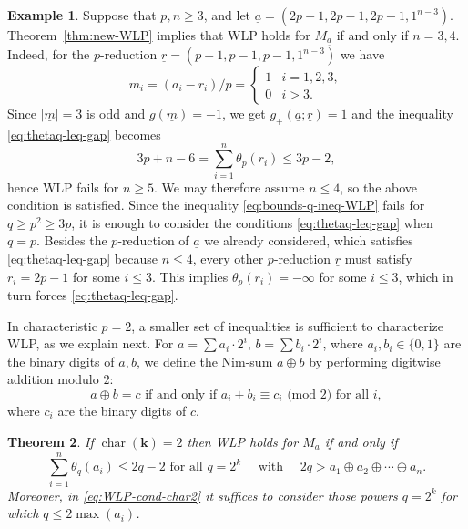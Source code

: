 \documentclass[11pt,reqno]{amsart}
\newcommand{\defi}[1]{{\upshape\sffamily #1}}
\def\kk{{\mathbf k}}
\newcommand{\op}[1]{\operatorname{#1}}
\newcommand{\ul}[1]{\underline{#1}}
\newtheorem{theorem}{Theorem}[section]
\theoremstyle{definition}
\newtheorem{example}[theorem]{Example}
\theoremstyle{remark}
\numberwithin{equation}{section}
\begin{document}
\begin{example}\label{ex:2p-1s}
    Suppose that $p,n\geq 3$, and let $\ul{a}=(2p-1,2p-1,2p-1,1^{n-3})$. Theorem~\ref{thm:new-WLP} implies that WLP holds for $M_{\ul{a}}$ if and only if $n=3,4$. Indeed, for the $p$-reduction $\ul{r}=(p-1,p-1,p-1,1^{n-3})$ we have 
    \[m_i = (a_i-r_i)/p=\begin{cases}
        1 & i=1,2,3,\\
        0 & i>3.
    \end{cases}\]
    Since $|\ul{m}|=3$ is odd and $g(\ul{m}) = -1$, we get $g_+(\ul{a};\ul{r})=1$ and the inequality \eqref{eq:thetaq-leq-gap} becomes
    \[3p+n-6 = \sum_{i=1}^n\theta_p(r_i)\leq 3p-2,\]
    hence WLP fails for $n\geq 5$. We may therefore assume $n\leq 4$, so the above condition is satisfied. Since the inequality \eqref{eq:bounds-q-ineq-WLP} fails for $q\geq p^2\geq 3p$, it is enough to consider the conditions \eqref{eq:thetaq-leq-gap} when $q=p$. Besides the $p$-reduction of $\ul{a}$ we already considered, which satisfies \eqref{eq:thetaq-leq-gap} because $n\leq 4$, every other $p$-reduction $\ul{r}$ must satisfy $r_i = 2p-1$ for some $i\leq 3$. This implies $\theta_p(r_i)=-\infty$ for some $i\leq 3$, which in turn forces \eqref{eq:thetaq-leq-gap}.
\end{example}

In characteristic $p=2$, a smaller set of inequalities is sufficient to characterize WLP, as we explain next. For $a=\sum a_i\cdot 2^i$, $b=\sum b_i\cdot 2^i$, where $a_i,b_i\in\{0,1\}$ are the binary digits of $a,b$, we define the \defi{Nim-sum} $a\oplus b$ by performing digitwise addition modulo $2$:
\begin{equation}\label{eq:def-Nimsum} 
a\oplus b = c\text{ if and only if }a_i + b_i \equiv c_i \text{ (mod }2)\text{ for all }i,
\end{equation}
where $c_i$ are the binary digits of $c$.

\begin{theorem}\label{thm:WLP-char-2}
    If $\op{char}(\kk)=2$ then WLP holds for $M_{\ul{a}}$ if and only if
    \begin{equation}\label{eq:WLP-cond-char2} \sum_{i=1}^n \theta_q(a_i) \leq 2q-2 \text{ for all }q=2^k\quad\text{ with }\quad 2q>a_1\oplus a_2\oplus\cdots\oplus a_n.
    \end{equation}
    Moreover, in \eqref{eq:WLP-cond-char2} it suffices to consider those powers $q=2^k$ for which $q\leq 2\max(a_i)$.
\end{theorem}
\end{document}
